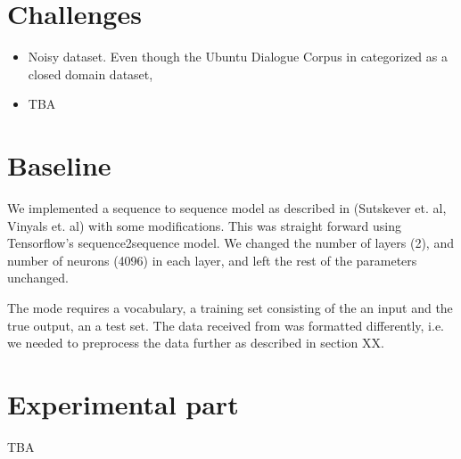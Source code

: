 \documentclass{article} %
\begin{document}




\section{Challenges}
\begin{itemize}
    \item Noisy dataset. Even though the Ubuntu Dialogue Corpus in categorized as a closed domain dataset,
    \item TBA 
\end{itemize}

\section{Baseline}

We implemented a sequence to sequence model as described in (Sutskever et. al, Vinyals et. al) with some modifications. This was straight forward using Tensorflow's sequence2sequence model. We changed the number of layers (2), and number of neurons (4096) in each layer, and left the rest of the parameters unchanged.

The mode requires a vocabulary, a training set consisting of the an input and the true output, an a test set. The data received from \cite{Ubuntu} was formatted differently, i.e. we needed to preprocess the data further as described in section XX.

\section{Experimental part}
TBA
\end{document}
